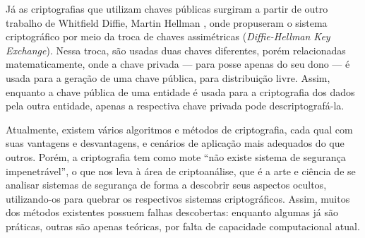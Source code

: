 Já as criptografias que utilizam chaves públicas surgiram a partir de outro trabalho de
Whitfield Diffie, Martin Hellman \cite{artigo:diffiehellman-public}, onde propuseram
o sistema criptográfico por meio da troca de chaves assimétricas (\emph{Diffie-Hellman
Key Exchange}). Nessa troca, são usadas duas chaves diferentes, porém relacionadas
matematicamente, onde a chave privada --- para posse apenas do seu dono --- é usada
para a geração de uma chave pública, para distribuição livre. Assim, enquanto a chave
pública de uma entidade é usada para a criptografia dos dados pela outra entidade,
apenas a respectiva chave privada pode descriptografá-la.

\newpage
Atualmente, existem vários algoritmos e métodos de criptografia, cada qual com suas
vantagens e desvantagens, e cenários de aplicação mais adequados do que outros. Porém,
a criptografia tem como mote ``não existe sistema de segurança impenetrável'', o que nos
leva à área de criptoanálise, que é a arte e ciência de se analisar sistemas de
segurança de forma a descobrir seus aspectos ocultos, utilizando-os para quebrar os
respectivos sistemas criptográficos. Assim, muitos dos métodos existentes possuem falhas
descobertas: enquanto algumas já são práticas, outras são apenas teóricas, por falta de
capacidade computacional atual.





